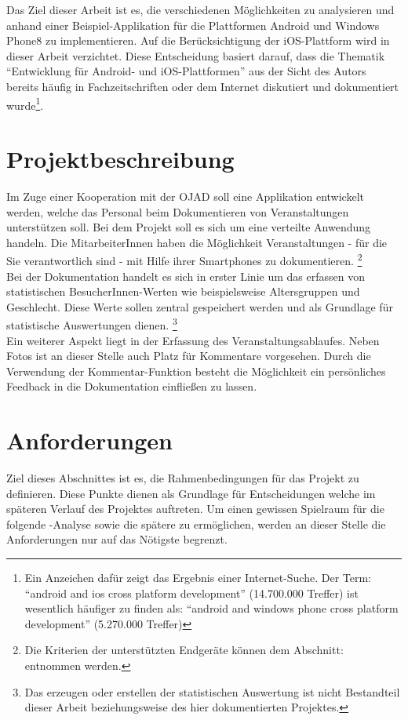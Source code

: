 \documentclass[Bachelorarbeit.tex]{subfiles}
\begin{document}
Das Ziel dieser Arbeit ist es, die verschiedenen Möglichkeiten zu analysieren und anhand einer Beispiel-Applikation für die Plattformen Android und Windows Phone8 zu implementieren.
Auf die Berücksichtigung der iOS-Plattform wird in dieser Arbeit verzichtet.
Diese Entscheidung basiert darauf, dass die Thematik "`Entwicklung für Android- und iOS-Plattformen"' aus der Sicht des Autors bereits häufig in Fachzeitschriften oder dem Internet diskutiert und dokumentiert wurde\footnote{Ein Anzeichen dafür zeigt das Ergebnis einer Internet-Suche. Der Term: "`android and ios cross platform development"' (14.700.000 Treffer) ist wesentlich häufiger zu finden als: "`android and windows phone cross platform development"' (5.270.000 Treffer) }. 
\\

\section{Projektbeschreibung}
\label{sec:projektbeschreibung}

Im Zuge einer Kooperation mit der \ac{OJAD} soll eine Applikation entwickelt werden, welche das Personal beim Dokumentieren von Veranstaltungen unterstützen soll. 
Bei dem Projekt soll es sich um eine verteilte Anwendung handeln. 
Die MitarbeiterInnen haben die Möglichkeit Veranstaltungen - für die Sie verantwortlich sind - mit Hilfe ihrer Smartphones zu dokumentieren. \footnote{Die Kriterien der unterstützten Endgeräte können dem Abschnitt:  entnommen werden.}
\\
Bei der Dokumentation handelt es sich in erster Linie um das erfassen von statistischen BesucherInnen-Werten wie beispielsweise Altersgruppen und Geschlecht. 
Diese Werte sollen zentral gespeichert werden und als Grundlage für statistische Auswertungen dienen.
\footnote{Das erzeugen oder erstellen der statistischen Auswertung ist nicht Bestandteil dieser Arbeit beziehungsweise des hier dokumentierten Projektes.}
\\
Ein weiterer Aspekt liegt in der Erfassung des Veranstaltungsablaufes. Neben Fotos ist an dieser Stelle auch Platz für Kommentare vorgesehen. 
Durch die Verwendung der Kommentar-Funktion besteht die Möglichkeit ein persönliches Feedback in die Dokumentation einfließen zu lassen. 
\newpage
 

\section{Anforderungen}
\label{sec:anforderungen}
Ziel dieses Abschnittes ist es, die Rahmenbedingungen für das Projekt zu definieren. 
Diese Punkte dienen als Grundlage für Entscheidungen welche im späteren Verlauf des Projektes auftreten.
Um einen gewissen Spielraum für die folgende -Analyse sowie die
spätere  zu ermöglichen, werden an dieser Stelle die Anforderungen nur auf das Nötigste begrenzt.
\end{document}
